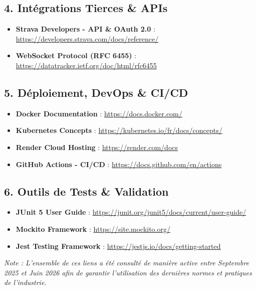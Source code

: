 \subsection*{4. Intégrations Tierces \& APIs}
\begin{itemize}
    \item \textbf{Strava Developers - API \& OAuth 2.0} : \url{https://developers.strava.com/docs/reference/}
    \item \textbf{WebSocket Protocol (RFC 6455)} : \url{https://datatracker.ietf.org/doc/html/rfc6455}
\end{itemize}

\subsection*{5. Déploiement, DevOps \& CI/CD}
\begin{itemize}
    \item \textbf{Docker Documentation} : \url{https://docs.docker.com/}
    \item \textbf{Kubernetes Concepts} : \url{https://kubernetes.io/fr/docs/concepts/}
    \item \textbf{Render Cloud Hosting} : \url{https://render.com/docs}
    \item \textbf{GitHub Actions - CI/CD} : \url{https://docs.github.com/en/actions}
\end{itemize}

\subsection*{6. Outils de Tests \& Validation}
\begin{itemize}
    \item \textbf{JUnit 5 User Guide} : \url{https://junit.org/junit5/docs/current/user-guide/}
    \item \textbf{Mockito Framework} : \url{https://site.mockito.org/}
    \item \textbf{Jest Testing Framework} : \url{https://jestjs.io/docs/getting-started}
\end{itemize}

\vspace{1cm}
\textit{Note : L'ensemble de ces liens a été consulté de manière active entre Septembre 2025 et Juin 2026 afin de garantir l'utilisation des dernières normes et pratiques de l'industrie.}
